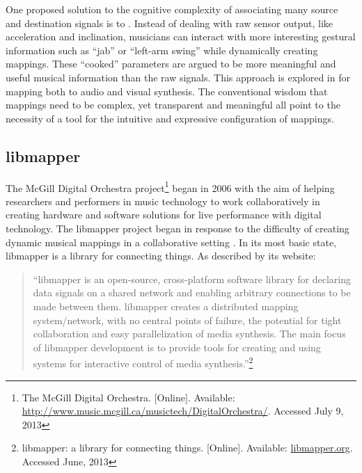 One proposed solution to the cognitive complexity of associating many source and destination signals is to . Instead of dealing with raw sensor output, like acceleration and inclination, musicians can interact with more interesting gestural information such as ``jab'' or ``left-arm swing'' while dynamically creating mappings. These ``cooked'' parameters are argued to be more meaningful and useful musical information than the raw signals. This approach is explored in  for mapping both to audio and visual synthesis. The conventional wisdom that mappings need to be complex, yet transparent and meaningful all point to the necessity of a tool for the intuitive and expressive configuration of mappings.

\subsection{libmapper}

The McGill Digital Orchestra project\footnote{The McGill Digital Orchestra. [Online]. Available: \url{http://www.music.mcgill.ca/musictech/DigitalOrchestra/}. Accessed July 9, 2013} began in 2006 with the aim of helping researchers  and performers in music technology to work collaboratively in creating hardware and software solutions for live performance with digital technology. The libmapper project began in response to the difficulty of creating dynamic musical mappings in a collaborative setting . In its most basic state, libmapper is a library for connecting things. As described by its website: 

\begin{quote} 
``libmapper is an open-source, cross-platform software library for declaring data signals on a shared network and enabling arbitrary connections to be made between them. libmapper creates a distributed mapping system/network, with no central points of failure, the potential for tight collaboration and easy parallelization of media synthesis. The main focus of libmapper development is to provide tools for creating and using systems for interactive control of media synthesis.''\footnote{libmapper: a library for connecting things. [Online]. Available: \url{libmapper.org}. Accessed June, 2013}
\end{quote}



